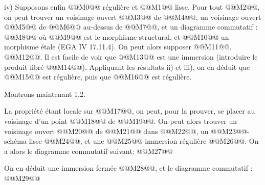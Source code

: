 
iv)
Supposons enfin @@M0@@ régulière et @@M1@@ lisse. Pour tout @@M2@@, on peut trouver un voisinage ouvert @@M3@@ de @@M4@@, un voisinage ouvert @@M5@@ de @@M6@@ au-dessus de @@M7@@, et un diagramme commutatif :
@@M8@@
où @@M9@@ est le morphisme structural, et @@M10@@ un morphisme étale (EGA IV 17.11.4). On peut alors supposer @@M11@@, @@M12@@. Il est facile de voir que @@M13@@ est une immersion (introduire le produit fibré @@M14@@). Appliquant les résultats ii) et iii), on en déduit que @@M15@@ est régulière, puis que @@M16@@ est régulière.

Montrons maintenant 1.2.

La propriété étant locale sur @@M17@@, on peut, pour la prouver, se placer au voisinage d'un point @@M18@@ de @@M19@@. On peut alors trouver un voisinage ouvert @@M20@@ de @@M21@@ dans @@M22@@, un @@M23@@-schéma lisse @@M24@@, et une @@M25@@-immersion régulière @@M26@@. On a alors le diagramme commutatif suivant:
@@M27@@

On en déduit une immersion fermée @@M28@@, et le diagramme commutatif :
@@M29@@
